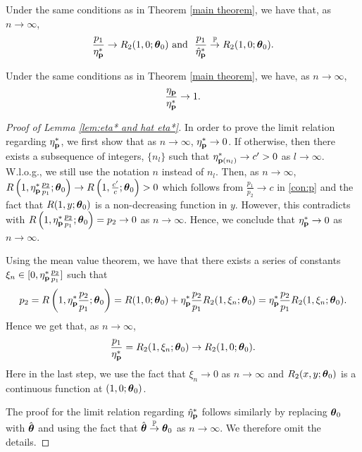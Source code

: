 \begin{lemma} \label{lem:eta* and hat eta*}
    Under the same conditions as in Theorem \ref{main theorem}, we have that, as $n\to\infty$,
$$\frac{p_1}{\h^*_\pb}\to R_2(1,0;\thb_0) \text{\ and \ }\frac{p_1}{\hat\h^*_\pb}\top R_2(1,0;\thb_0).$$
\end{lemma}
\begin{lemma} \label{lem:eta and eta*}
    Under the same conditions as in Theorem \ref{main theorem}, we have, as $n\to\infty$,
    $$\frac{\eta_{\mathbf p}}{\eta^*_{\mathbf p}}\to1.$$
\end{lemma}
\begin{proof}[Proof of Lemma \ref{lem:eta* and hat eta*}]
In order to prove the limit relation regarding $\eta^*_{\mathbf p}$, we first show that as $n\to\infty$, $\eta^*_{\mathbf p}\to 0$. If otherwise, then there exists a subsequence of integers, $\{n_l\}$ such that $\eta^*_{{\mathbf p}(n_l)}\to c'>0$ as $l\to\infty$. W.l.o.g., we still use the notation $n$ instead of $n_l$. Then, as $n\to\infty$, $R\left(1,\eta^*_{\mathbf p}\frac{p_2}{p_1};\boldsymbol{\theta}_0\right)\to R\left(1,\frac{c'}{c};\boldsymbol{\theta}_0\right)>0$ which follows from $\frac{p_1}{p_2}\to c$ in \ref{con:p} and the fact that $R(1,y;\boldsymbol{\theta}_0)$ is a non-decreasing function in $y$. However, this contradicts with $R\left(1,\eta^*_{\mathbf p}\frac{p_2}{p_1};\boldsymbol{\theta}_0\right)=p_2\to 0$ as $n\to\infty$. Hence, we conclude that $\eta^*_{\mathbf p}\to 0$ as $n\to\infty$.

Using the mean value theorem, we have that there exists a series of constants $\xi_n\in[0, \eta^*_{\mathbf p}\frac{p_2}{p_1}]$ such that
$$
p_2=R\left(1,\eta^*_{\mathbf p}\frac{p_2}{p_1};\boldsymbol{\theta}_0\right)=R(1,0;\boldsymbol{\theta}_0)+\eta^*_{\mathbf p}\frac{p_2}{p_1} R_2(1,\xi_n;\boldsymbol{\theta}_0)=\eta^*_{\mathbf p}\frac{p_2}{p_1} R_2(1,\xi_n;\boldsymbol{\theta}_0).
$$
Hence we get that, as $n\to\infty$,
$$\frac{p_1}{\eta^*_{\mathbf p}}=R_2(1,\xi_n;\boldsymbol{\theta}_0)\to R_2(1,0;\boldsymbol{\theta}_0).$$
Here in the last step, we use the fact that $\xi_n\to 0$ as $n\to\infty$ and $R_2(x,y;\boldsymbol{\theta}_0)$ is a continuous function at $(1,0;\boldsymbol{\theta}_0)$.

The proof for the limit relation regarding $\hat{\eta}^*_{\mathbf p}$ follows similarly by replacing $\boldsymbol{\theta}_0$ with $\hat{\boldsymbol{\theta}}$ and using the fact that $\hat\thb\top\thb_0$ as $n\to\infty$. We therefore omit the details.
\end{proof}


